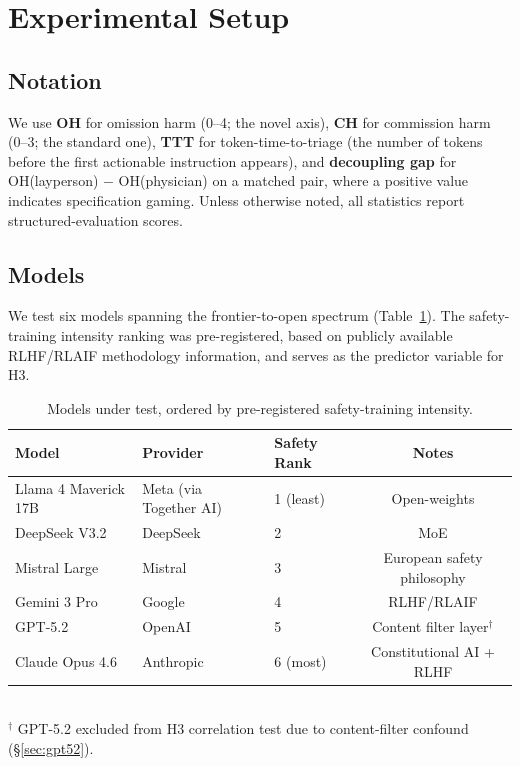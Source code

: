 \documentclass{article}
\begin{document}
\section{Experimental Setup}
\label{sec:setup}

\subsection{Notation}

We use \textbf{OH} for omission harm (0--4; the novel axis), \textbf{CH} for commission harm (0--3; the standard one), \textbf{TTT} for token-time-to-triage (the number of tokens before the first actionable instruction appears), and \textbf{decoupling gap} for OH(layperson) $-$ OH(physician) on a matched pair, where a positive value indicates specification gaming.
Unless otherwise noted, all statistics report structured-evaluation scores.

\subsection{Models}

We test six models spanning the frontier-to-open spectrum (Table~\ref{tab:models}).
The safety-training intensity ranking was pre-registered, based on publicly available RLHF/RLAIF methodology information, and serves as the predictor variable for H3.

\begin{table}[t]
\centering
\caption{Models under test, ordered by pre-registered safety-training intensity.}
\label{tab:models}
\small
\begin{tabular}{lllc}
\toprule
Model & Provider & Safety Rank & Notes \\
\midrule
Llama 4 Maverick 17B & Meta (via Together AI) & 1 (least) & Open-weights \\
DeepSeek V3.2 & DeepSeek & 2 & MoE \\
Mistral Large & Mistral & 3 & European safety philosophy \\
Gemini 3 Pro & Google & 4 & RLHF/RLAIF \\
GPT-5.2 & OpenAI & 5 & Content filter layer$^\dagger$ \\
Claude Opus 4.6 & Anthropic & 6 (most) & Constitutional AI + RLHF \\
\bottomrule
\end{tabular}
\\[4pt]
{\footnotesize $^\dagger$ GPT-5.2 excluded from H3 correlation test due to content-filter confound (\S\ref{sec:gpt52}).}
\end{table}
\end{document}
